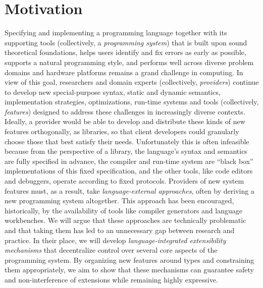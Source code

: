 \vspace{-25pt}
\section{Motivation}\label{motivation}
Specifying and implementing a programming language together with its supporting tools (collectively, a \emph{programming system}) that is built upon sound theoretical foundations, helps users identify and fix errors as early as possible, supports a natural programming style, and performs well across diverse problem domains and hardware platforms remains a grand challenge in computing. In view of this goal, researchers and domain experts (collectively, \emph{providers}) continue to develop new special-purpose syntax, static and dynamic semantics, implementation strategies, optimizations, run-time systems and tools (collectively, \emph{features})  designed to address these challenges in increasingly diverse contexts. Ideally, a provider would be able to develop and distribute these kinds of new features orthogonally, as libraries, so that client developers could granularly choose those that best satisfy their needs. Unfortunately this is often infeasible because from the perspective of a library, the language's syntax and semantics are fully specified in advance, the compiler and run-time system are ``black box'' implementations of this fixed specification, and the other tools, like code editors and debuggers, operate according to fixed protocols. Providers of new system features must, as a result, take \emph{language-external approaches}, often by deriving a new programming system altogether. This approach has been encouraged, historically, by the availability of tools like compiler generators and language workbenches. We will argue that these approaches are technically problematic and that taking them has led to an unnecessary gap between research and practice. In their place, we will develop \emph{language-integrated extensibility mechanisms} that decentralize control over several core aspects of the programming system. By organizing new features around {types} and constraining them appropriately, we aim to show that these mechanisms can guarantee safety and non-interference of extensions while remaining highly expressive.

